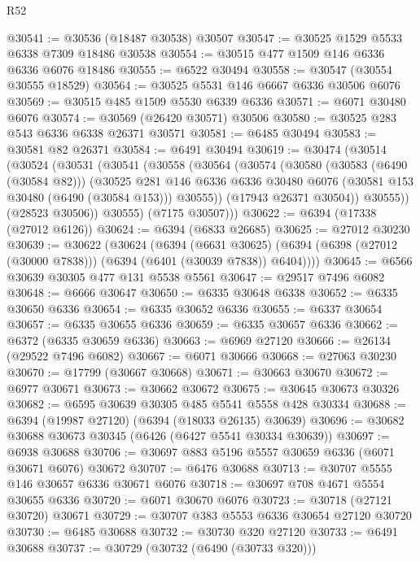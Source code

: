 \begin{lexlean}{R52}
\begin{coremodule}
@30541 := @30536 (@18487 @30538) @30507
@30547 := @30525 @1529 @5533 @6338 @7309 @18486 @30538
@30554 := @30515 @477 @1509 @146 @6336 @6336 @6076 @18486
@30555 := @6522 @30494
@30558 := @30547 (@30554 @30555 @18529)
@30564 := @30525 @5531 @146 @6667 @6336 @30506 @6076
@30569 := @30515 @485 @1509 @5530 @6339 @6336
@30571 := @6071 @30480 @6076
@30574 := @30569 (@26420 @30571) @30506
@30580 := @30525 @283 @543 @6336 @6338 @26371 @30571
@30581 := @6485 @30494
@30583 := @30581 @82 @26371
@30584 := @6491 @30494
@30619 := @30474
    (@30514
      (@30524
        (@30531
          (@30541
            (@30558
              (@30564
                (@30574
                  (@30580
                    (@30583 (@6490 (@30584 @82)))
                    (@30525
                      @281
                      @146
                      @6336
                      @6336
                      @30480
                      @6076
                      (@30581 @153 @30480 (@6490 (@30584 @153)))
                      @30555))
                  (@17943 @26371 @30504))
                @30555))
            (@28523 @30506))
          @30555)
        (@7175 @30507)))
@30622 := @6394 (@17338 (@27012 @6126))
@30624 := @6394 (@6833 @26685)
@30625 := @27012 @30230
@30639 := @30622
    (@30624
      (@6394
        (@6631 @30625)
        (@6394 (@6398 (@27012 (@30000 @7838))) (@6394 (@6401 (@30039 @7838)) @6404))))
@30645 := @6566 @30639 @30305 @477 @131 @5538 @5561
@30647 := @29517 @7496 @6082
@30648 := @6666 @30647
@30650 := @6335 @30648 @6338
@30652 := @6335 @30650 @6336
@30654 := @6335 @30652 @6336
@30655 := @6337 @30654
@30657 := @6335 @30655 @6336
@30659 := @6335 @30657 @6336
@30662 := @6372 (@6335 @30659 @6336)
@30663 := @6969 @27120
@30666 := @26134 (@29522 @7496 @6082)
@30667 := @6071 @30666
@30668 := @27063 @30230
@30670 := @17799 (@30667 @30668)
@30671 := @30663 @30670
@30672 := @6977 @30671
@30673 := @30662 @30672
@30675 := @30645 @30673 @30326
@30682 := @6595 @30639 @30305 @485 @5541 @5558 @428 @30334
@30688 := @6394 (@19987 @27120) (@6394 (@18033 @26135) @30639)
@30696 := @30682 @30688 @30673 @30345 (@6426 (@6427 @5541 @30334 @30639))
@30697 := @6938 @30688
@30706 := @30697 @883 @5196 @5557 @30659 @6336 (@6071 @30671 @6076) @30672
@30707 := @6476 @30688
@30713 := @30707 @5555 @146 @30657 @6336 @30671 @6076
@30718 := @30697 @708 @4671 @5554 @30655 @6336
@30720 := @6071 @30670 @6076
@30723 := @30718 (@27121 @30720) @30671
@30729 := @30707 @383 @5553 @6336 @30654 @27120 @30720
@30730 := @6485 @30688
@30732 := @30730 @320 @27120
@30733 := @6491 @30688
@30737 := @30729 (@30732 (@6490 (@30733 @320)))

\end{coremodule}
\end{lexlean}
